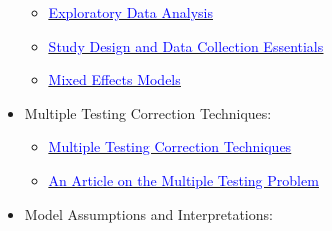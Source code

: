 \documentclass[
]{article}
\providecommand{\tightlist}{%
  \setlength{\itemsep}{0pt}\setlength{\parskip}{0pt}}
\begin{document}
\begin{itemize}
  \begin{itemize}
  \tightlist
  \item
    \href{https://community.grad.ubc.ca/gps/event/22318}{\underline{\textcolor{blue}{Exploratory Data Analysis}}}
  \item
    \href{https://community.grad.ubc.ca/gps/event/22327}{\underline{\textcolor{blue}{Study Design and Data Collection Essentials}}}
  \item
    \href{https://community.grad.ubc.ca/gps/event/22330}{\underline{\textcolor{blue}{Mixed Effects Models}}}
  \end{itemize}
\item
  Multiple Testing Correction Techniques:

  \begin{itemize}
  \tightlist
  \item
    \href{https://www.stat.berkeley.edu/~mgoldman/Section0402.pdf}{\underline{\textcolor{blue}{Multiple Testing Correction Techniques}}}
  \item
    \href{https://egap.org/resource/10-things-to-know-about-multiple-comparisons/}{\underline{\textcolor{blue}{An Article on the Multiple Testing Problem}}}
  \end{itemize}
\item
  Model Assumptions and Interpretations:


\end{itemize}
\end{document}
